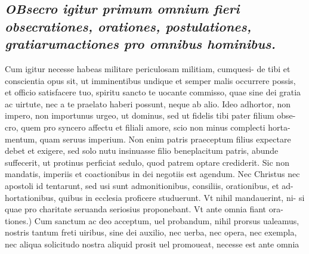 \documentclass{article}
\begin{document}
\begin{pages}
\subsection*{\textit{\huge\textbf{O}\normalsize Bsecro igitur primum omnium fieri obsecrationes, orationes, postulationes, gratiarumactiones pro omnibus hominibus. }}\pstart Cum igitur necesse habeas militare periculosam militiam, cumquesi- de tibi et conscientia opus sit, ut imminentibus undique  et semper malis occurrere possis, et officio satisfacere tuo, spiritu sancto te uocante commisso, quae sine dei gratia ac uirtute, nec a te praelato haberi possunt, neque  ab alio. Ideo adhortor, non impero, non importunus urgeo, ut dominus, sed ut fidelis tibi pater filium obse- cro, quem pro syncero affectu et filiali amore, scio non minus complecti horta- mentum, quam seruus imperium. Non enim patris praeceptum filius expectare debet et exigere, sed solo nutu insinuasse filio beneplacitum patris, abunde suffecerit, ut protinus perficiat sedulo, quod patrem optare crediderit. Sic non mandatis, imperiis et coactionibus in dei negotiis est agendum. Nec Christus nec apostoli id tentarunt, sed usi sunt admonitionibus, consiliis, orationibus, et ad- hortationibus, quibus in ecclesia proficere studuerunt. Vt nihil mandauerint, ni- si quae pro charitate seruanda seriosius proponebant. Vt ante omnia fiant ora- tiones.) Cum sanctum ac deo acceptum, uel probandum, nihil prorsus ualeamus, nostris tantum freti uiribus, sine dei auxilio, nec uerba, nec opera, nec exempla, nec aliqua solicitudo nostra aliquid prosit uel promoueat, necesse est ante omnia  \pend

\end{pages}
\end{document}
